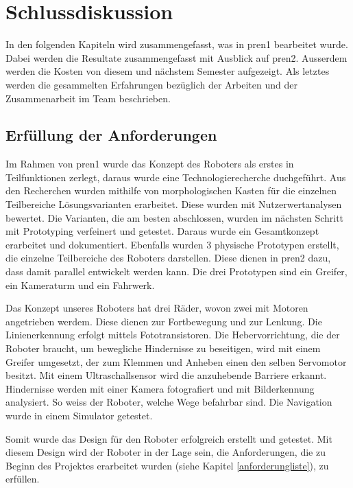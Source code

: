 \section{Schlussdiskussion}

In den folgenden Kapiteln wird zusammengefasst, was in \acrshort{pren1} bearbeitet wurde.
Dabei werden die Resultate zusammengefasst mit Ausblick auf \acrshort{pren2}.
Ausserdem werden die Kosten von diesem und nächstem Semester aufgezeigt.
Als letztes werden die gesammelten Erfahrungen bezüglich der Arbeiten und der Zusammenarbeit im Team beschrieben.

\subsection{Erfüllung der Anforderungen}

Im Rahmen von \acrshort{pren1} wurde das Konzept des Roboters als erstes in Teilfunktionen zerlegt, daraus wurde eine Technologierecherche duchgeführt. Aus den Recherchen wurden mithilfe von morphologischen Kasten für die einzelnen Teilbereiche Lösungsvarianten erarbeitet. Diese wurden mit Nutzerwertanalysen bewertet. Die Varianten, die am besten abschlossen, wurden im nächsten Schritt mit Prototyping verfeinert und getestet. Daraus wurde ein Gesamtkonzept erarbeitet und dokumentiert. Ebenfalls wurden 3 physische Prototypen erstellt, die einzelne Teilbereiche des Roboters darstellen. Diese dienen in \acrshort{pren2} dazu, dass damit parallel entwickelt werden kann. Die drei Prototypen sind ein Greifer, ein Kameraturm und ein Fahrwerk.

Das Konzept unseres Roboters hat drei Räder, wovon zwei mit Motoren angetrieben werdem. Diese dienen zur Fortbewegung und zur Lenkung. Die Linienerkennung erfolgt mittels Fototransistoren. Die Hebervorrichtung, die der Roboter braucht, um bewegliche Hindernisse zu beseitigen, wird mit einem Greifer umgesetzt, der zum Klemmen und Anheben einen den selben Servomotor besitzt. Mit einem Ultraschallsensor wird die anzuhebende Barriere erkannt. 
Hindernisse werden mit einer Kamera fotografiert und mit Bilderkennung analysiert. So weiss der Roboter, welche Wege befahrbar sind. Die Navigation wurde in einem Simulator getestet.

Somit wurde das Design für den Roboter erfolgreich erstellt und getestet. Mit diesem Design wird der Roboter in der Lage sein, die Anforderungen, die zu Beginn des Projektes erarbeitet wurden (siehe Kapitel \ref{anforderungliste}), zu erfüllen.

